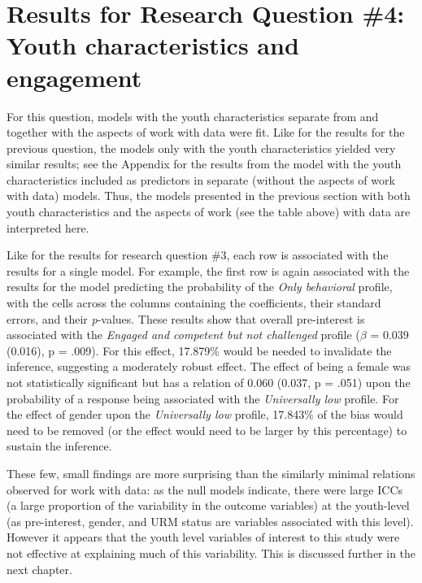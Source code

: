 \documentclass[]{book}
\theoremstyle{definition}
\theoremstyle{definition}
\theoremstyle{definition}
\theoremstyle{remark}
\begin{document}
\section{Results for Research Question \#4: Youth characteristics and
engagement}\label{results-for-research-question-4-youth-characteristics-and-engagement}

For this question, models with the youth characteristics separate from
and together with the aspects of work with data were fit. Like for the
results for the previous question, the models only with the youth
characteristics yielded very similar results; see the Appendix for the
results from the model with the youth characteristics included as
predictors in separate (without the aspects of work with data) models.
Thus, the models presented in the previous section with both youth
characteristics and the aspects of work (see the table above) with data
are interpreted here.

Like for the results for research question \#3, each row is associated
with the results for a single model. For example, the first row is again
associated with the results for the model predicting the probability of
the \emph{Only behavioral} profile, with the cells across the columns
containing the coefficients, their standard errors, and their
\emph{p}-values. These results show that overall pre-interest is
associated with the \emph{Engaged and competent but not challenged}
profile (\(\beta\) = 0.039 (0.016), p = .009). For this effect, 17.879\%
would be needed to invalidate the inference, suggesting a moderately
robust effect. The effect of being a female was not statistically
significant but has a relation of 0.060 (0.037, p = .051) upon the
probability of a response being associated with the \emph{Universally
low} profile. For the effect of gender upon the \emph{Universally low}
profile, 17.843\% of the bias would need to be removed (or the effect
would need to be larger by this percentage) to sustain the inference.

These few, small findings are more surprising than the similarly minimal
relations observed for work with data: as the null models indicate,
there were large ICCs (a large proportion of the variability in the
outcome variables) at the youth-level (as pre-interest, gender, and URM
status are variables associated with this level). However it appears
that the youth level variables of interest to this study were not
effective at explaining much of this variability. This is discussed
further in the next chapter.
\end{document}
